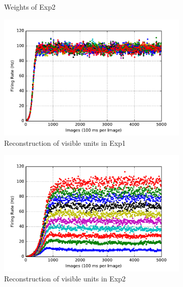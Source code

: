\begin{figure}
\begin{subfigure}[t]{0.4\textwidth}
		\caption{Weights of Exp2}
	\end{subfigure}
	\begin{subfigure}[t]{0.4\textwidth}
		\includegraphics[width=\textwidth]{pics_sdlm/13_exp_SRBM_noise_long/exp1_recon_s.pdf}
		\caption{Reconstruction of visible units in Exp1}
	\end{subfigure}
	\begin{subfigure}[t]{0.4\textwidth}
		\includegraphics[width=\textwidth]{pics_sdlm/13_exp_SRBM_noise_long/exp2_recon_s.pdf}
		\caption{Reconstruction of visible units in Exp2}
	\end{subfigure}\\
	\begin{subfigure}[t]{0.4\textwidth}

\end{subfigure}
\end{figure}
